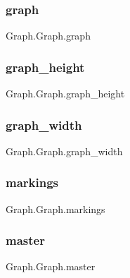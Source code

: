 \subsubsection{\texorpdfstring{graph}{graph}}
{\footnotesize\ttfamily Graph.\+Graph.\+graph}

\hypertarget{class_graph_1_1_graph_a5b96246e91f3e2ccf0f19119848b9f61}{}\label{class_graph_1_1_graph_a5b96246e91f3e2ccf0f19119848b9f61} 
\subsubsection{\texorpdfstring{graph\+\_\+height}{graph\_height}}
{\footnotesize\ttfamily Graph.\+Graph.\+graph\+\_\+height}

\hypertarget{class_graph_1_1_graph_a9d1f6105ebc5552ee56febfd95e8ff30}{}\label{class_graph_1_1_graph_a9d1f6105ebc5552ee56febfd95e8ff30} 
\subsubsection{\texorpdfstring{graph\+\_\+width}{graph\_width}}
{\footnotesize\ttfamily Graph.\+Graph.\+graph\+\_\+width}

\hypertarget{class_graph_1_1_graph_a2b6f5b97b6e3bbc3f4892f61f2e4c13e}{}\label{class_graph_1_1_graph_a2b6f5b97b6e3bbc3f4892f61f2e4c13e} 
\subsubsection{\texorpdfstring{markings}{markings}}
{\footnotesize\ttfamily Graph.\+Graph.\+markings}

\hypertarget{class_graph_1_1_graph_a40721968f5bd764c0bf522441d4d190b}{}\label{class_graph_1_1_graph_a40721968f5bd764c0bf522441d4d190b} 
\subsubsection{\texorpdfstring{master}{master}}
{\footnotesize\ttfamily Graph.\+Graph.\+master}

